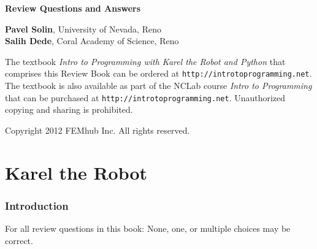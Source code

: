 \documentclass[article,A4,12pt]{llncs}
\newif\iffullversion
\begin{document}
\begin{center}
\vspace{2.8cm}
{\huge \bf Review Questions and Answers}
\end{center}
\vbox{}
\begin{center}
\iffullversion
\else
\vspace{2mm}
\centerline{\huge \color{red}{PREVIEW}}
\fi
\vfill
{\large
{\bf Pavel Solin}, University of Nevada, Reno\\
{\bf Salih Dede}, Coral Academy of Science, Reno
}
\end{center}
\newpage
\vbox{}
\vfill
\begin{center}
{
The textbook {\em Intro to Programming with Karel the Robot and Python} that 
comprises this Review Book
can be ordered at {\tt http://introtoprogramming.net}. The textbook 
is also available as part of the NCLab course {\em Intro to Programming} 
that can be purchased at {\tt http://introtoprogramming.net}.
Unauthorized copying and sharing is prohibited.
}
\vfill

Copyright 2012 FEMhub Inc. All rights reserved.
\end{center}




\section*{}
\small

\normalsize

\newpage
\setcounter{tocdepth}{2}
\tableofcontents

\newpage

\pagestyle{plain}
\setcounter{page}{1}


\part{Karel the Robot}

\section{Introduction}

For all review questions in this book: None, one, or multiple
choices may be correct.
\end{document}
